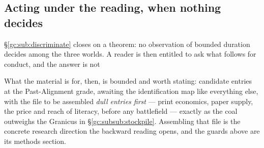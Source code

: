 \documentclass[11pt]{article}
\numberwithin{equation}{section}
\theoremstyle{plain}
\theoremstyle{definition}
\theoremstyle{remark}
\begin{document}
\subsection{Acting under the reading, when nothing decides}
\label{gc:sub:acting}

\S\ref{gc:sub:discriminate} closes on a theorem: no observation of
bounded duration decides among the three worlds. A reader is then
entitled to ask what follows for conduct, and the answer is not

What the material is for, then, is bounded and worth stating: candidate
entries at the Past-Alignment grade, awaiting the identification map
like everything else, with the file to be assembled \emph{dull entries
first} --- print economics, paper supply, the price and reach of
literacy, before any battlefield --- exactly as the coal outweighs the
Granicus in \S\ref{gc:subsub:stockpile}. Assembling that file is the
concrete research direction the backward reading opens, and the guards
above are its methods section.
\end{document}
